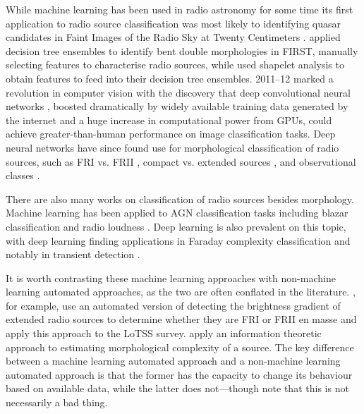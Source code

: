         While machine learning has been used in radio astronomy for some time \citep[e.g. the NVSS used neural networks to detect sidelobes;][]{condon98nvss} its first application to radio source classification was most likely to identifying quasar candidates \citep{carballo_selection_2004} in Faint Images of the Radio Sky at Twenty Centimeters \citep[FIRST;][]{becker95first}. \citet{proctor06} applied decision tree ensembles to identify bent double morphologies in FIRST, manually selecting features to characterise radio sources, while \citet{bastien_classifying_2017} used shapelet analysis to obtain features to feed into their decision tree ensembles. 2011--12 marked a revolution in computer vision with the discovery that deep convolutional neural networks \citep[known as early as 1989, see][]{lecun_backpropagation_1989}, boosted dramatically by widely available training data generated by the internet and a huge increase in computational power from GPUs, could achieve greater-than-human performance on image classification tasks. Deep neural networks have since found use for morphological classification of radio sources, such as FRI vs. FRII \parencites{aniyan17cnn,ma_machine_2019,lukic_morphological_2019,tang_transfer_2019,samudre_data-efficient_2020,bowles_attention-gating_2020}[see also][]{ma_radio_2018}, compact vs. extended sources \citep{lukic18compact,alhassan_first_2018,lukic_morphological_2019}, and observational classes \citep{galvin19som,ralph19ae}.

        There are also many works on classification of radio sources besides morphology. Machine learning has been applied to AGN classification tasks including blazar classification \citep{arsioli_machine_2020} and radio loudness \citep{beaklini_agn_2020}. Deep learning is also prevalent on this topic, with deep learning finding applications in Faraday complexity classification \citep{brown_classifying_2018} and notably in transient detection \citep{connor_applying_2018,guo_pulsar_2019,wang_pulsar_2019,agarwal_fetch_2020,lin_pulsar_2020,zhang_applying_2020,balakrishnan_pulsar_2020}.

        It is worth contrasting these machine learning approaches with non-machine learning automated approaches, as the two are often conflated in the literature. \citet{mingo_revisiting_2019}, for example, use an automated version of detecting the brightness gradient of extended radio sources to determine whether they are FRI or FRII en masse and apply this approach to the LoTSS survey. \citet{segal_identifying_2019} apply an information theoretic approach to estimating morphological complexity of a source. The key difference between a machine learning automated approach and a non-machine learning automated approach is that the former has the capacity to change its behaviour based on available data, while the latter does not---though note that this is not necessarily a bad thing.

